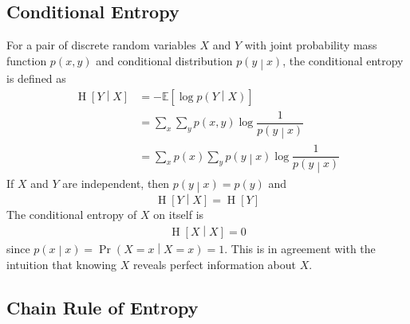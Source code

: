 \documentclass[11pt]{report} %
\begin{document}
\subsection{Conditional Entropy}

For a pair of discrete random variables $X$ and $Y$ with joint probability mass function $p\left(x, y\right)$ and conditional distribution $p\left(y\middle|x\right)$, the conditional entropy is defined as
\begin{align}
\operatorname{H}\left[Y\middle|X\right] &= - \mathbb{E}\left[\log p\left(Y\middle|X\right)\right] \\
&= \sum_{x}\sum_{y}p\left(x, y\right)\log\dfrac{1}{p\left(y\middle|x\right)} \\
&= \sum_{x}p\left(x\right)\sum_{y}p\left(y\middle|x\right)\log\dfrac{1}{p\left(y\middle|x\right)}
\end{align}
If $X$ and $Y$ are independent, then $p\left(y\middle|x\right) = p\left(y\right)$ and
\begin{equation}
\operatorname{H}\left[Y\middle|X\right] = \operatorname{H}\left[Y\right]
\end{equation}
The conditional entropy of $X$ on itself is
\begin{align}
\operatorname{H}\left[X\middle|X\right] = 0
\end{align}
since $p\left(x\middle|x\right) = \operatorname{Pr}\left(X = x\middle|X = x\right) = 1$. This is in agreement with the intuition that knowing $X$ reveals perfect information about $X$.

\subsection{Chain Rule of Entropy}
\end{document}
